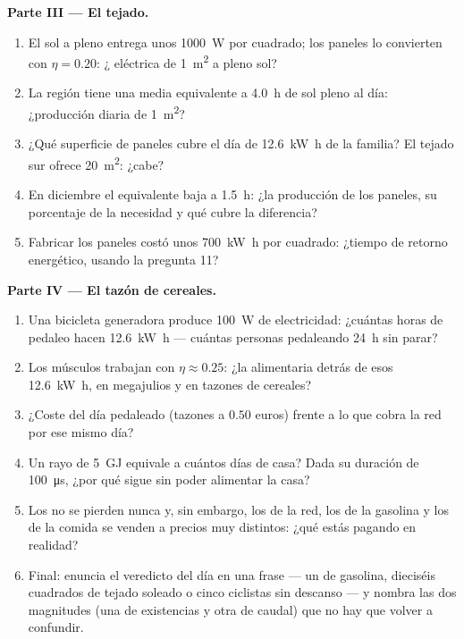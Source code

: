 \begin{problem}
\medskip
\noindent\textbf{Parte III --- El tejado.}
\begin{enumerate}[resume]
  \item El sol a pleno  entrega unos \qty{1000}{W} por 
        cuadrado; los paneles lo convierten con $\eta = 0.20$: ¿
        eléctrica de \qty{1}{m^2} a pleno sol?
  \item La región tiene una media equivalente a \qty{4.0}{h} de sol
        pleno al día: ¿producción diaria de \qty{1}{m^2}?
  \item ¿Qué superficie de paneles cubre el día de \qty{12.6}{kW.h} de
        la familia? El tejado sur ofrece \qty{20}{m^2}: ¿cabe?
  \item En diciembre el equivalente baja a \qty{1.5}{h}: ¿la producción
        de los paneles, su porcentaje de la necesidad y qué cubre la
        diferencia?
  \item Fabricar los paneles costó unos \qty{700}{kW.h} por 
        cuadrado: ¿tiempo de retorno energético, usando la pregunta 11?
\end{enumerate}

\medskip
\noindent\textbf{Parte IV --- El tazón de cereales.}
\begin{enumerate}[resume]
  \item Una bicicleta generadora produce \qty{100}{W} de electricidad:
        ¿cuántas horas de pedaleo hacen \qty{12.6}{kW.h} --- cuántas
        personas pedaleando \qty{24}{h} sin parar?
  \item Los músculos trabajan con $\eta \approx 0.25$: ¿la 
        alimentaria detrás de esos \qty{12.6}{kW.h}, en megajulios y en
        tazones de cereales?
  \item ¿Coste del día pedaleado (tazones a $0.50$ euros) frente a lo
        que cobra la red por ese mismo día?
  \item Un rayo de \qty{5}{GJ} equivale a cuántos días de casa? Dada su
        duración de \qty{100}{\micro s}, ¿por qué sigue sin poder
        alimentar la casa?
  \item Los  no se pierden nunca y, sin embargo, los de la red,
        los de la gasolina y los de la comida se venden a precios muy
        distintos: ¿qué estás pagando en realidad?
  \item Final: enuncia el veredicto del día en una frase --- un
         de gasolina, dieciséis  cuadrados de tejado
        soleado o cinco ciclistas sin descanso --- y nombra las dos
        magnitudes (una de existencias y otra de caudal) que no hay que
        volver a confundir.
\end{enumerate}
\end{problem}
